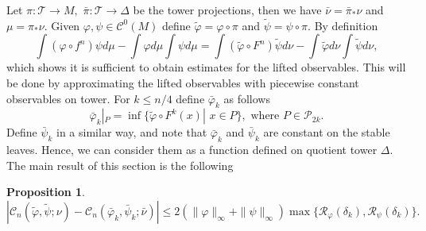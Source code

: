 \documentclass[a4paper,12pt]{amsart}
\numberwithin{equation}{section}
\newtheorem{proposition}[theorem]{Proposition}
\begin{document}
Let $\pi:\mathcal T\to M,$ $\bar\pi: \mathcal T\to \Delta$ be the
tower projections, then we have  $\bar\nu=\bar\pi_\ast\nu$ and
$\mu=\pi_\ast\nu.$ Given $\varphi, \psi\in \mathcal C^0(M)$ define
$\tilde\varphi=\varphi\circ\pi$ and $\tilde\psi=\psi\circ\pi.$ By
definition
$$\int(\varphi\circ f^n)\psi d\mu-\int\varphi d\mu\int\psi d\mu=
\int(\tilde\varphi\circ F^n)\tilde\psi d\nu-\int\tilde\varphi
d\nu\int\tilde\psi d\nu,$$ which shows it is sufficient to obtain
estimates for the lifted observables. This will be done by
approximating the lifted observables with piecewise constant
observables on tower. For $k\le n/4$ define $\bar\varphi_k$ as
follows
$$
\bar\varphi_k|_P=\inf\{\tilde\varphi\circ F^k(x)| \,\, x\in P\},
\,\,\text{where} \,\, P\in\mathcal P_{2k}.
$$
Define $\bar\psi_k$ in a similar way, and note that $\bar\varphi_k$
and $\bar\psi_k$ are constant on the stable leaves. Hence, we can
consider them as a function defined on quotient tower $\Delta.$ The
main result of this section is the following
\begin{proposition}\label{aprox}
$$|\mathcal C_n(\tilde\varphi, \tilde\psi; \nu)-
\mathcal C_n(\bar\varphi_k, \bar\psi_k;\bar\nu)|\le
2(\|\varphi\|_\infty+\|\psi\|_\infty)\max\{\mathcal
R_\varphi(\delta_k), \mathcal R_\psi(\delta_k)\}.$$
\end{proposition}
\end{document}
